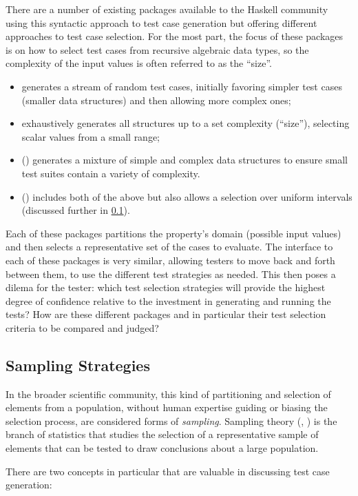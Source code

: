 There are a number of existing \pbt packages available to the Haskell community
using this syntactic approach to test case generation but 
offering different approaches to test case selection.
For the most part, the focus of these packages is on how to select test cases
from recursive algebraic data types,
so the complexity of the input values is often referred to as the ``size''.
\begin{itemize}
\item \QC generates a stream of random test cases,
initially favoring simpler test cases (smaller data structures) and then allowing more complex ones;
\item \SC exhaustively generates all structures up to a set complexity (``size''),
selecting scalar values from a small range;
\item \EC (\cite{EasyCheck2008}) generates a mixture of
simple and complex data structures to ensure small test suites contain a variety of complexity.
\item \FEAT(\cite{Duregard2012}) includes both of the above but
also allows a selection over uniform intervals (discussed further in \ref{}).
\end{itemize}
\noindent
Each of these packages partitions the property's domain (possible input values)
and then selects a representative set of the cases to evaluate.
The interface to each of these packages is very similar,
allowing testers to move back and forth between them,
to use the different test strategies as needed.
This then poses a dilema for the tester:
which test selection strategies will provide
the highest degree of confidence
relative to the investment in generating and running the tests?
How are these different packages and in particular their test selection criteria 
to be compared and judged?

\subsection{Sampling Strategies}
In the broader scientific community,
this kind of partitioning and selection of elements from a population,
without human expertise guiding or biasing the selection process,
are considered forms of \emph{sampling}.
Sampling theory (\cite{Stuart1968}, \cite{Cochran1977}) is 
the branch of statistics that studies
the selection of a representative sample of elements 
that can be tested to draw conclusions about a large population.

There are two concepts in particular that are valuable in discussing test case generation:


